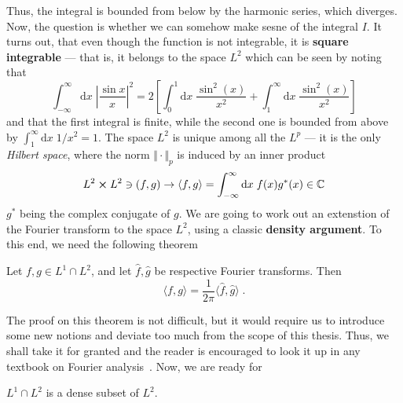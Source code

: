 Thus, the integral is bounded from below by the harmonic series, which diverges.
Now, the question is whether we can somehow make sesne of the integral \(I\).
It turns out, that
even though the function is not integrable, it is \textbf{square integrable} --- that is, it belongs to the
space \(L^2\)
which can be seen by noting that
\begin{equation}
    \int_{-\infty }^{\infty} \mathrm{d}x \; \left|\frac{\sin x}x\right|^2  =
    2\left[ \int_{0}^{1} \mathrm{d}x \; \frac{\sin^2(x)}{x^2} + \int_{1}^{\infty } \mathrm{d}x \; \frac{\sin^2(x)}{x^2}   \right]
\end{equation}
and that the first integral is finite, while the second one is bounded from above by \(\int_{1}^{\infty}\mathrm{d}x\;  1/x^2 = 1\).
The space \(L^2\) is unique among all the \(L^p\) --- it is the only \textit{Hilbert space},
where the norm \(\Vert \cdot \Vert_p \) is induced by an inner product
\begin{equation}
    L^2 \cross L^2 \ni (f,g) \to \langle f,g \rangle = \int_{-\infty}^{\infty} \mathrm{d}x \; f(x)g^*(x) \in \mathbb{C}
\end{equation}
\(g^*\) being the complex conjugate of \(g\). We are going to work out an extenstion of the Fourier transform
to the space \(L^2\), using a classic \textbf{density argument}. To this end, we need the following theorem
\begin{theorem}

    Let \(f,g \in L^1 \cap L^2\), and let \(\hat{f},\hat{g}\) be respective Fourier transforms. Then
    \begin{equation*}
        \langle f,g \rangle = \frac{1}{2\pi }\langle \hat{f} ,\hat{g}  \rangle  \; .
    \end{equation*}
\end{theorem}
The proof on this theorem is not difficult, but it would require us to introduce some new notions and deviate
too much from the scope of this thesis. Thus, we shall take it for granted and the reader is encouraged to
look it up in any textbook on Fourier analysis~\autocite{Rudin1987,Stein2011}. Now, we are ready for
\begin{theorem}
    \(L^1 \cap L^2\) is a dense subset of \(L^2\).
\end{theorem}
